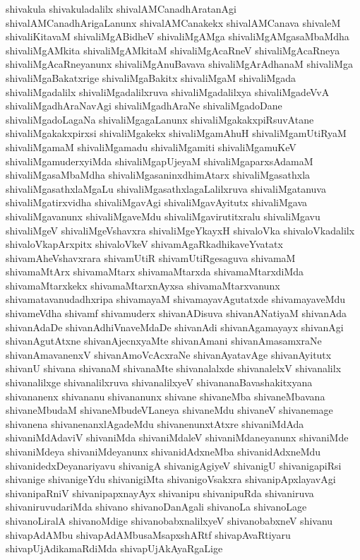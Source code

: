 {shivakula
shivakuladalilx
shivalAMCanadhAratanAgi
shivalAMCanadhArigaLanunx
shivalAMCanakekx
shivalAMCanava
shivaleM
shivaliKitavaM
shivaliMgABidheV
shivaliMgAMga
shivaliMgAMgasaMbaMdha
shivaliMgAMkita
shivaliMgAMkitaM
shivaliMgAcaRneV
shivaliMgAcaRneya
shivaliMgAcaRneyanunx
shivaliMgAnuBavava
shivaliMgArAdhanaM
shivaliMga
shivaliMgaBakatxrige
shivaliMgaBakitx
shivaliMgaM
shivaliMgada
shivaliMgadalilx
shivaliMgadalilxruva
shivaliMgadalilxya
shivaliMgadeVvA
shivaliMgadhAraNavAgi
shivaliMgadhAraNe
shivaliMgadoDane
shivaliMgadoLagaNa
shivaliMgagaLanunx
shivaliMgakakxpiRsuvAtane
shivaliMgakakxpirxsi
shivaliMgakekx
shivaliMgamAhuH
shivaliMgamUtiRyaM
shivaliMgamaM
shivaliMgamadu
shivaliMgamiti
shivaliMgamuKeV
shivaliMgamuderxyiMda
shivaliMgapUjeyaM
shivaliMgaparxsAdamaM
shivaliMgasaMbaMdha
shivaliMgasaninxdhimAtarx
shivaliMgasathxla
shivaliMgasathxlaMgaLu
shivaliMgasathxlagaLalilxruva
shivaliMgatanuva
shivaliMgatirxvidha
shivaliMgavAgi
shivaliMgavAyitutx
shivaliMgava
shivaliMgavanunx
shivaliMgaveMdu
shivaliMgavirutitxralu
shivaliMgavu
shivaliMgeV
shivaliMgeVshavxra
shivaliMgeYkayxH
shivaloVka
shivaloVkadalilx
shivaloVkapArxpitx
shivaloVkeV
shivamAgaRkadhikaveYvatatx
shivamAheVshavxrara
shivamUtiR
shivamUtiRgesaguva
shivamaM
shivamaMtArx
shivamaMtarx
shivamaMtarxda
shivamaMtarxdiMda
shivamaMtarxkekx
shivamaMtarxnAyxsa
shivamaMtarxvanunx
shivamatavanudadhxripa
shivamayaM
shivamayavAgutatxde
shivamayaveMdu
shivameVdha
shivamf
shivamuderx
shivanADisuva
shivanANatiyaM
shivanAda
shivanAdaDe
shivanAdhiVnaveMdaDe
shivanAdi
shivanAgamayayx
shivanAgi
shivanAgutAtxne
shivanAjecnxyaMte
shivanAmani
shivanAmasamxraNe
shivanAmavanenxV
shivanAmoVcAcxraNe
shivanAyatavAge
shivanAyitutx
shivanU
shivana
shivanaM
shivanaMte
shivanalalxde
shivanalelxV
shivanalilx
shivanalilxge
shivanalilxruva
shivanalilxyeV
shivananaBavashakitxyana
shivananenx
shivananu
shivananunx
shivane
shivaneMba
shivaneMbavana
shivaneMbudaM
shivaneMbudeVLaneya
shivaneMdu
shivaneV
shivanemage
shivanena
shivanenanxlAgadeMdu
shivanenunxtAtxre
shivaniMdAda
shivaniMdAdaviV
shivaniMda
shivaniMdaleV
shivaniMdaneyanunx
shivaniMde
shivaniMdeya
shivaniMdeyanunx
shivanidAdxneMba
shivanidAdxneMdu
shivanidedxDeyanariyavu
shivanigA
shivanigAgiyeV
shivanigU
shivanigapiRsi
shivanige
shivanigeYdu
shivanigiMta
shivanigoVsakxra
shivanipApxlayavAgi
shivanipaRniV
shivanipapxnayAyx
shivanipu
shivanipuRda
shivaniruva
shivaniruvudariMda
shivano
shivanoDanAgali
shivanoLa
shivanoLage
shivanoLiralA
shivanoMdige
shivanobabxnalilxyeV
shivanobabxneV
shivanu
shivapAdAMbu
shivapAdAMbusaMsapxshARtf
shivapAvaRtiyaru
shivapUjAdikamaRdiMda
shivapUjAkAyaRgaLige
}
